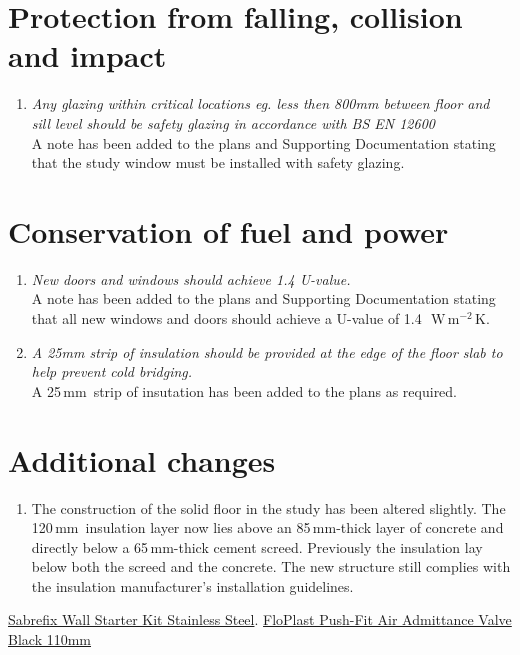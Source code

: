 \documentclass{extension}
\newcommand{\mm}{\,$\mathrm{mm}$}
\newcommand{\uunit}{\,$\mathrm{W\,m^{-2}\,K}$}
\begin{document}
\section{Protection from falling, collision and impact}
\begin{enumerate}
\item {\it Any glazing within critical locations eg. less then 800mm between floor and sill level should be safety glazing in accordance with BS EN 12600}\\
A note has been added to the plans and Supporting Documentation stating that the study window must be installed with safety glazing.
\end{enumerate}

\section{Conservation of fuel and power}
\begin{enumerate}
\item {\it New doors and windows should achieve 1.4 U-value.}\\
A note has been added to the plans and Supporting Documentation stating that all new windows and doors should achieve a U-value of 1.4~\uunit .
\item {\it A 25mm strip of insulation should be provided at the edge of the floor slab to help prevent cold bridging.}\\
A 25\mm\ strip of insutation has been added to the plans as required.
\end{enumerate}

\section{Additional changes}
\begin{enumerate}
\item The construction of the solid floor in the study has been altered slightly. The 120\mm\ insulation layer now lies above an 85\mm -thick layer of concrete and directly below a 65\mm -thick cement screed. Previously the insulation lay below both the screed and the concrete. The new structure still complies with the insulation manufacturer's installation guidelines.
\end{enumerate}


\begin{thebibliography}{9}
 \href{https://www.screwfix.com/p/sabrefix-wall-starter-kit-stainless-steel/56037?kpid=56037&cm_mmc=Google-_-Datafeed-_-Building%20and%20Doors?kpid=KINASEKPID&cm_mmc=Google-_-TOKEN1-_-TOKEN2&gclid=EAIaIQobChMIvrnvoZmQgQMVjIFQBh3P7gMrEAQYAiABEgIWrvD_BwE&gclsrc=aw.ds}{Sabrefix Wall Starter Kit Stainless Steel}.
\href{https://www.screwfix.com/p/floplast-push-fit-air-admittance-valve-black-110mm/35001} {FloPlast Push-Fit Air Admittance Valve Black 110mm}



\end{thebibliography}
\end{document}
